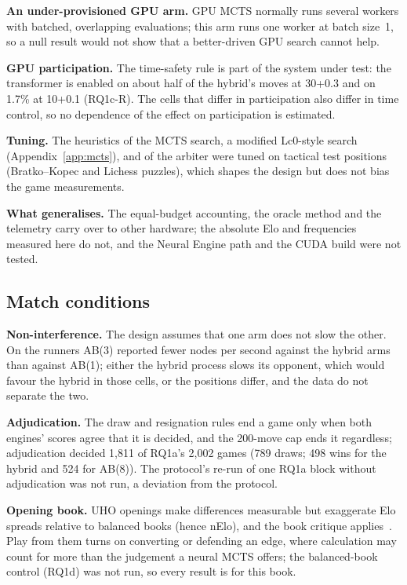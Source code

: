 \documentclass{article}
\begin{document}
\textbf{An under-provisioned GPU arm.} GPU MCTS normally runs several workers with batched, overlapping evaluations; this arm runs one worker at batch size~1, so a null result would not show that a better-driven GPU search cannot help.

\textbf{GPU participation.} The time-safety rule is part of the system under test: the transformer is enabled on about half of the hybrid's moves at 30+0.3 and on 1.7\% at 10+0.1 (RQ1c-R). The cells that differ in participation also differ in time control, so no dependence of the effect on participation is estimated.

\textbf{Tuning.} The heuristics of the MCTS search, a modified Lc0-style search (Appendix~\ref{app:mcts}), and of the arbiter were tuned on tactical test positions (Bratko--Kopec and Lichess puzzles), which shapes the design but does not bias the game measurements.

\textbf{What generalises.} The equal-budget accounting, the oracle method and the telemetry carry over to other hardware; the absolute Elo and frequencies measured here do not, and the Neural Engine path and the CUDA build were not tested.

\subsection{Match conditions}
\textbf{Non-interference.} The design assumes that one arm does not slow the other. On the runners AB(3) reported fewer nodes per second against the hybrid arms than against AB(1); either the hybrid process slows its opponent, which would favour the hybrid in those cells, or the positions differ, and the data do not separate the two.

\textbf{Adjudication.} The draw and resignation rules end a game only when both engines' scores agree that it is decided, and the 200-move cap ends it regardless; adjudication decided 1{,}811 of RQ1a's 2{,}002 games (789 draws; 498 wins for the hybrid and 524 for AB(8)). The protocol's re-run of one RQ1a block without adjudication was not run, a deviation from the protocol.

\textbf{Opening book.} UHO openings make differences measurable but exaggerate Elo spreads relative to balanced books (hence nElo), and the book critique applies~\cite{uhocritique}. Play from them turns on converting or defending an edge, where calculation may count for more than the judgement a neural MCTS offers; the balanced-book control (RQ1d) was not run, so every result is for this book.
\end{document}
